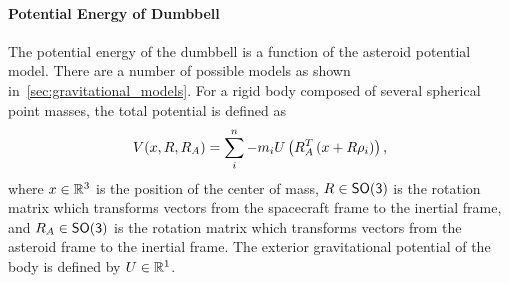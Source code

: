 \paragraph{Potential Energy of Dumbbell}
The potential energy of the dumbbell is a function of the asteroid potential model.
There are a number of possible models as shown in~\cref{sec:gravitational_models}.
For a rigid body composed of several spherical point masses, the total potential is defined as
\begin{align}\label{eq:inertial_potential_energy}
    V(x, R, R_A) = \sum_{i}^n - m_i U \left( R_A^T \left( x + R \rho_i \right) \right),
\end{align}
where \( x \in \mathbb{R}^3\) is the position of the center of mass, \( R \in \mathsf{SO(3)}\) is the rotation matrix which transforms vectors from the spacecraft frame to the inertial frame, and \( R_A \in \mathsf{SO(3)} \) is the rotation matrix which transforms vectors from the asteroid frame to the inertial frame.
The exterior gravitational potential of the body is defined by \( U \in \mathbb{R}^1 \).

